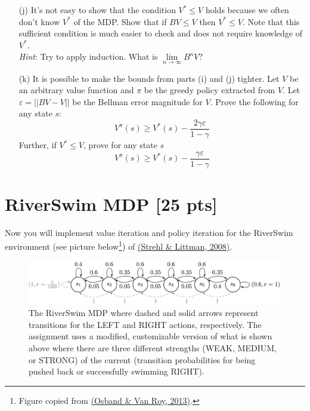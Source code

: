 \documentclass[11pt]{article}
\let\epsilon\varepsilon
\begin{document}
\begin{enumerate}
    \item[(j)] It's not easy to show that the condition $V^* \leq V$ holds because we often don't know $V^*$ of the MDP. Show that if $BV \leq V$ then $V^* \leq V$. Note that this sufficient condition is much easier to check and does not require knowledge of $V^*$. \\
    \textit{Hint}: Try to apply induction. What is $\lim\limits_{n \rightarrow \infty} B^n V$?
\newpage
\item[(k)] It is possible to make the bounds from parts (i) and (j) tighter. 
Let $V$ be an arbitrary value function and $\pi$ be the greedy policy extracted from $V$. Let $\epsilon = ||BV-V||$ be the Bellman error magnitude for $V$. Prove the following for any state $s$:
\begin{equation}
        V^\pi(s) \geq V^*(s) - \frac{2\gamma\epsilon}{1-\gamma}
\end{equation}
Further, if $V^* \leq V$, prove for any state $s$
\begin{equation}
        V^\pi(s) \geq V^*(s) - \frac{\gamma\epsilon}{1-\gamma}
\end{equation}
\end{enumerate}
\newpage

\noindent 


\newpage

\section{RiverSwim MDP [25 pts]}
Now you will implement value iteration and policy iteration for the RiverSwim environment (see picture below\footnote{Figure copied from \href{https://proceedings.neurips.cc/paper/2013/hash/6a5889bb0190d0211a991f47bb19a777-Abstract.html}{(Osband \& Van Roy, 2013)}.}) of \href{https://www.sciencedirect.com/science/article/pii/S0022000008000767}{(Strehl \& Littman, 2008)}.
\begin{figure}[h]
    \centering
    \includegraphics[width=\linewidth]{RiverSwim.png}
    \caption{The RiverSwim MDP where dashed and solid arrows represent transitions for the \textsc{LEFT} and \textsc{RIGHT} actions, respectively. The assignment uses a modified, customizable version of what is shown above where there are three different strengths (\textsc{WEAK}, \textsc{MEDIUM}, or \textsc{STRONG}) of the current (transition probabilities for being pushed back or successfully swimming \textsc{RIGHT}).}
    \label{fig:riverswim}
\end{figure}
\end{document}
